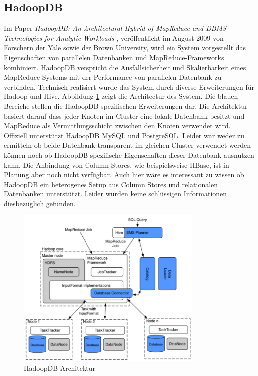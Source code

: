 \documentclass[a4paper]{article}
\begin{document}
\subsection{HadoopDB}
Im Paper \textit{HadoopDB: An Architectural Hybrid of MapReduce and DBMS Technologies for Analytic Workloads} \cite{HadoopDB2009}, veröffentlicht im August 2009 von Forschern der Yale sowie der Brown University, wird ein System vorgestellt das Eigenschaften von parallelen Datenbanken und MapReduce-Frameworks kombiniert. HadoopDB verspricht die Ausfallsicherheit und Skalierbarkeit eines MapReduce-Systems mit der Performance von parallelen Datenbank zu verbinden. Technisch realisiert wurde das System durch diverse Erweiterungen für Hadoop und Hive. Abbildung \ref{fig:hadoopdb} zeigt die Architectur des System. Die blauen Bereiche stellen die HadoopDB-spezifischen Erweiterungen dar. Die Architektur basiert darauf dass jeder Knoten im Cluster eine lokale Datenbank besitzt und MapReduce als Vermittlungsschicht zwischen den Knoten verwendet wird. Offiziell unterstützt HadoopDB MySQL und PostgreSQL. Leider war weder zu ermitteln ob beide Datenbank transparent im gleichen Cluster verwendet werden können noch ob HadoopDB spezifische Eigenschaften dieser Datenbank ausnutzen kann. Die Anbindung von Column Stores, wie beispielsweise HBase, ist in Planung aber noch nicht verfügbar. Auch hier wäre es interessant zu wissen ob HadoopDB ein heterogenes Setup aus Column Stores und relationalen Datenbanken unterstützt. Leider wurden keine schlüssigen Informationen diesbezüglich gefunden.

\begin{figure}[H]
\centering
\includegraphics[width=0.8\textwidth]{hadoopdb-architecture.png}
\caption{HadoopDB Architektur \cite{HadoopDB2010}}
\label{fig:hadoopdb}
\end{figure}
\end{document}
